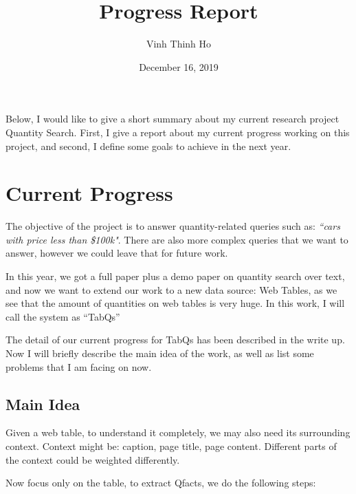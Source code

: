 \documentclass{article}
\title{Progress Report}
\author{Vinh Thinh Ho}
\date{December 16, 2019}
\begin{document}
\maketitle
Below, I would like to give a short summary about my current research project Quantity Search. First, I give a report about my current progress working on this project, and second, I define some goals to achieve in the next year.
\section{Current Progress}
The objective of the project is to answer quantity-related queries such as: \textit{``cars with price less than \$100k"}. There are also more complex queries that we want to answer, however we could leave that for future work. 

In this year, we got a full paper plus a demo paper on quantity search over text, and now we want to extend our work to a new data source: Web Tables, as we see that the amount of quantities on web tables is very huge. In this work, I will call the system as ``TabQs'' 

The detail of our current progress for TabQs has been described in the write up. Now I will briefly describe the main idea of the work, as well as list some problems that I am facing on now.
\subsection{Main Idea}
Given a web table, to understand it completely, we may also need its surrounding context. Context might be: caption, page title, page content. Different parts of the context could be weighted differently.

Now focus only on the table, to extract Qfacts, we do the following steps:
\end{document}

